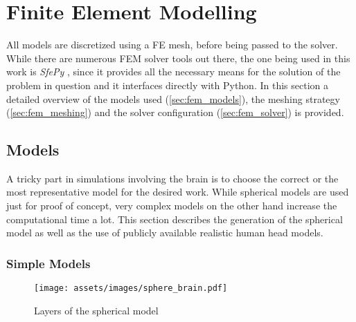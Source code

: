 \pagebreak
\chapter{Finite Element Modelling}

All models are discretized using a \gls{FE} mesh, before being passed to the solver. While there are numerous \gls{FEM} solver tools out there, the one being used in this work is \textit{SfePy} \cite{Cimrman2019}, since it provides all the necessary means for the solution of the problem in question and it interfaces directly with Python. In this section a detailed overview of the models used (\autoref{sec:fem_models}), the meshing strategy (\autoref{sec:fem_meshing}) and the solver configuration (\autoref{sec:fem_solver}) is provided.

\section{Models}
\label{sec:fem_models}

A tricky part in simulations involving the brain is to choose the correct or the most representative model for the desired work. While spherical models are used just for proof of concept, very complex models on the other hand increase the computational time a lot. This section describes the generation of the spherical model as well as the use of publicly available realistic human head models.

\subsection{Simple Models}
\begin{wrapfigure}{r}{0.35\textwidth}
    \centering
    \texttt{[image: assets/images/sphere\_brain.pdf]}
    \caption{Layers of the spherical model}
    \vspace{-4cm}
    \label{fig:sphere_brain}
\end{wrapfigure}

